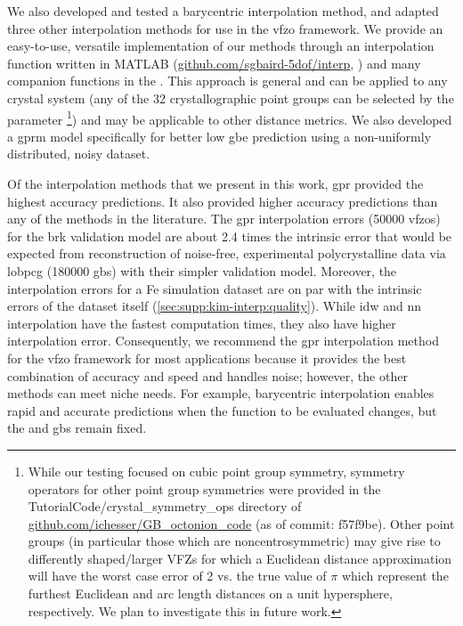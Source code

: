 \documentclass[final,twocolumn,12pt]{elsarticle}
\begin{document}
We also developed and tested a barycentric interpolation method, and adapted three other interpolation methods for use in the \gls{vfzo} framework. We provide an easy-to-use, versatile implementation of our methods through an interpolation function  written in MATLAB  (\url{github.com/sgbaird-5dof/interp}, \cite{bairdFiveDegreeofFreedom5DOF2020}) and many companion functions in the \vfzorepo{}.  This approach is general and can be applied to any crystal system (any of the 32 crystallographic point groups can be selected by the parameter \footnote{While our testing focused on cubic point group symmetry, symmetry operators for other point group symmetries were provided in the TutorialCode/crystal\_symmetry\_ops directory of \url{github.com/ichesser/GB\_octonion\_code} (as of commit: f57f9be). Other point groups (in particular those which are noncentrosymmetric) may give rise to differently shaped/larger VFZs for which a Euclidean distance approximation will have the worst case error of 2 vs. the true value of $\pi$ which represent the furthest Euclidean and arc length distances on a unit hypersphere, respectively. We plan to investigate this in future work.}) and may be applicable to other distance metrics. We also developed a \gls{gprm} model specifically for better low \gls{gbe} prediction using a non-uniformly distributed, noisy dataset.

Of the interpolation methods that we present in this work, \Gls{gpr} provided the highest accuracy predictions. It also provided higher accuracy predictions than any of the methods in the literature. The \gls{gpr} interpolation errors (\num{50000} \glspl{vfzo}) for the \gls{brk} validation model are about 2.4 times the intrinsic error that would be expected from reconstruction of noise-free, experimental polycrystalline data via \gls{lobpcg} \cite{shenDeterminingGrainBoundary2019} (\num{180000} \glspl{gb}) with their simpler validation model. Moreover, the interpolation errors for a Fe simulation dataset are on par with the intrinsic errors of the dataset itself (\cref{sec:supp:kim-interp:quality}). While \gls{idw} and \gls{nn} interpolation have the fastest computation times, they also have higher interpolation error. Consequently, we recommend the \gls{gpr} interpolation method for the \gls{vfzo} framework for most applications because it provides the best combination of accuracy and speed and handles \inpt{} noise; however, the other methods can meet niche needs. For example, barycentric interpolation enables rapid and accurate predictions when the function to be evaluated changes, but the \inpt{} and \outpt{} \glspl{gb} remain fixed.
\end{document}
